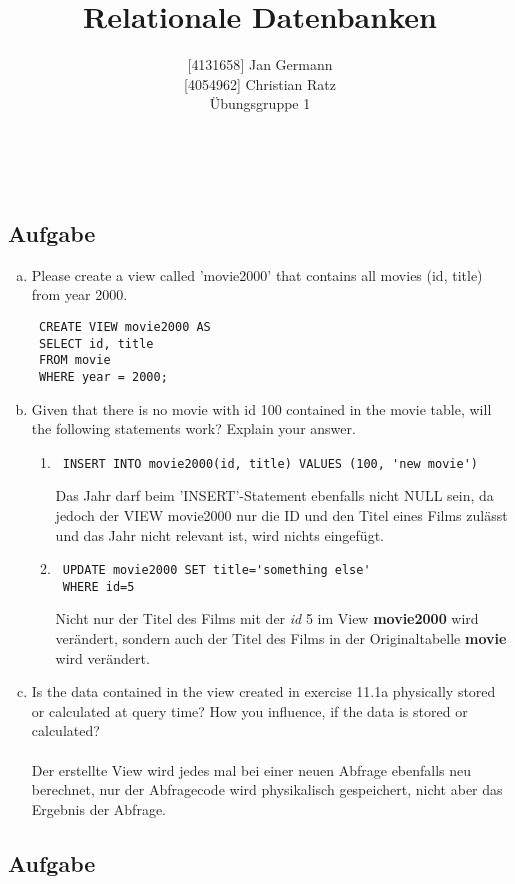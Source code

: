 \documentclass[11pt,a4paper,DIV=9]{scrartcl}
\author{{[}4131658{]} Jan Germann \\{[}4054962{]} Christian Ratz\\Übungsgruppe 1}
\title{Relationale Datenbanken}
\newcounter{temp}
\newcommand{\aufgabe}[1]{
  \setcounter{temp}{\value{subsection}}
  \setcounter{subsection}{#1}
  \addtocounter{subsection}{-1}
  \subsection{Aufgabe}
  \setcounter{subsection}{\value{temp}}
}
\renewcommand{\author}[1]{\renewcommand{\author}{#1}}
\renewcommand{\title}[1]{\renewcommand{\title}{#1}}
\newcommand{\makehomeworktitle}{
  \begin{minipage}[t]{6.5cm}
    \sf{\author}
  \end{minipage}
  \begin{minipage}[t]{6.5cm}
    \begin{flushright}
      \sf{\title\\\today}
    \end{flushright}
  \end{minipage}
  \\[0.2cm]
  \begin{center}
    \sf{
      \color{blue}{
        \LARGE{Aufgabenblatt \blattnr}
      }
    }
  \end{center}
  \vspace{0.1cm}
}
\begin{document}
\makehomeworktitle
   \aufgabe{1}
     \begin{enumerate}[a.]
 \item Please create a view called 'movie2000' that contains all movies (id, title) from year 2000.
 \begin{lstlisting}
 CREATE VIEW movie2000 AS
 SELECT id, title
 FROM movie
 WHERE year = 2000;
 \end{lstlisting}
 \item Given that there is no movie with id 100 contained in the movie table, will the following statements work? Explain your answer.
 \begin{enumerate}[1.]
 \item 
 \begin{lstlisting}
 INSERT INTO movie2000(id, title) VALUES (100, 'new movie')
 \end{lstlisting}
 Das Jahr darf beim 'INSERT'-Statement ebenfalls nicht NULL sein, da jedoch der VIEW movie2000 nur die ID und den Titel eines Films zul\"asst und das Jahr nicht relevant ist, wird nichts eingef\"ugt. 
 \item 
 \begin{lstlisting}
 UPDATE movie2000 SET title='something else'
 WHERE id=5
 \end{lstlisting}
 Nicht nur der Titel des Films mit der \textit{id} 5 im View \textbf{movie2000} wird ver\"andert, sondern auch der Titel des Films in der Originaltabelle \textbf{movie} wird ver\"andert.
 \end{enumerate}
 \item Is the data contained in the view created in exercise 11.1a physically stored or calculated at query time? How you influence, if the data is stored or calculated? \\\\
 Der erstellte View wird jedes mal bei einer neuen Abfrage ebenfalls neu berechnet, nur der Abfragecode wird physikalisch gespeichert, nicht aber das Ergebnis der Abfrage.
 \end{enumerate}
\aufgabe{2}
\end{document}
